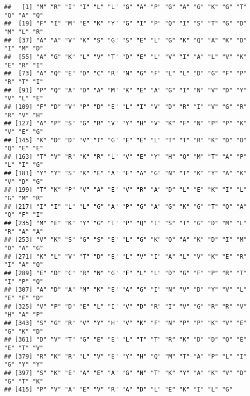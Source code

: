 \documentclass[
]{article}
\newenvironment{Shaded}{\begin{snugshade}}{\end{snugshade}}
\newcommand{\KeywordTok}[1]{\textcolor[rgb]{0.13,0.29,0.53}{\textbf{#1}}}
\newcommand{\NormalTok}[1]{#1}
\newcommand{\OperatorTok}[1]{\textcolor[rgb]{0.81,0.36,0.00}{\textbf{#1}}}
\begin{document}
\begin{Shaded}
\end{Shaded}

\begin{verbatim}
##   [1] "M" "R" "I" "I" "L" "L" "G" "A" "P" "G" "A" "G" "K" "G" "T" "Q" "A" "Q"
##  [19] "F" "I" "M" "E" "K" "Y" "G" "I" "P" "Q" "I" "S" "T" "G" "D" "M" "L" "R"
##  [37] "A" "A" "V" "K" "S" "G" "S" "E" "L" "G" "K" "Q" "A" "K" "D" "I" "M" "D"
##  [55] "A" "G" "K" "L" "V" "T" "D" "E" "L" "V" "I" "A" "L" "V" "K" "E" "R" "I"
##  [73] "A" "Q" "E" "D" "C" "R" "N" "G" "F" "L" "L" "D" "G" "F" "P" "R" "T" "I"
##  [91] "P" "Q" "A" "D" "A" "M" "K" "E" "A" "G" "I" "N" "V" "D" "Y" "V" "L" "E"
## [109] "F" "D" "V" "P" "D" "E" "L" "I" "V" "D" "R" "I" "V" "G" "R" "R" "V" "H"
## [127] "A" "P" "S" "G" "R" "V" "Y" "H" "V" "K" "F" "N" "P" "P" "K" "V" "E" "G"
## [145] "K" "D" "D" "V" "T" "G" "E" "E" "L" "T" "T" "R" "K" "D" "D" "Q" "E" "E"
## [163] "T" "V" "R" "K" "R" "L" "V" "E" "Y" "H" "Q" "M" "T" "A" "P" "L" "I" "G"
## [181] "Y" "Y" "S" "K" "E" "A" "E" "A" "G" "N" "T" "K" "Y" "A" "K" "V" "D" "G"
## [199] "T" "K" "P" "V" "A" "E" "V" "R" "A" "D" "L" "E" "K" "I" "L" "G" "M" "R"
## [217] "I" "I" "L" "L" "G" "A" "P" "G" "A" "G" "K" "G" "T" "Q" "A" "Q" "F" "I"
## [235] "M" "E" "K" "Y" "G" "I" "P" "Q" "I" "S" "T" "G" "D" "M" "L" "R" "A" "A"
## [253] "V" "K" "S" "G" "S" "E" "L" "G" "K" "Q" "A" "K" "D" "I" "M" "D" "A" "G"
## [271] "K" "L" "V" "T" "D" "E" "L" "V" "I" "A" "L" "V" "K" "E" "R" "I" "A" "Q"
## [289] "E" "D" "C" "R" "N" "G" "F" "L" "L" "D" "G" "F" "P" "R" "T" "I" "P" "Q"
## [307] "A" "D" "A" "M" "K" "E" "A" "G" "I" "N" "V" "D" "Y" "V" "L" "E" "F" "D"
## [325] "V" "P" "D" "E" "L" "I" "V" "D" "R" "I" "V" "G" "R" "R" "V" "H" "A" "P"
## [343] "S" "G" "R" "V" "Y" "H" "V" "K" "F" "N" "P" "P" "K" "V" "E" "G" "K" "D"
## [361] "D" "V" "T" "G" "E" "E" "L" "T" "T" "R" "K" "D" "D" "Q" "E" "E" "T" "V"
## [379] "R" "K" "R" "L" "V" "E" "Y" "H" "Q" "M" "T" "A" "P" "L" "I" "G" "Y" "Y"
## [397] "S" "K" "E" "A" "E" "A" "G" "N" "T" "K" "Y" "A" "K" "V" "D" "G" "T" "K"
## [415] "P" "V" "A" "E" "V" "R" "A" "D" "L" "E" "K" "I" "L" "G"
\end{verbatim}

\begin{Shaded}
\end{Shaded}
\end{document}

